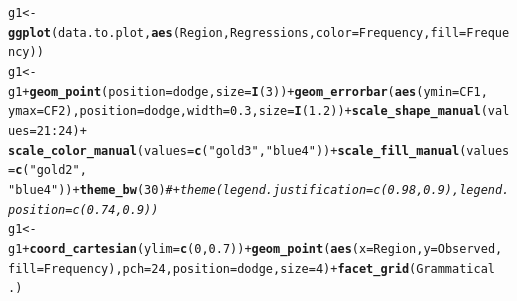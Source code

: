 \documentclass{article}\usepackage[]{graphicx}\usepackage[]{color}
\makeatletter
\newcommand{\hlnum}[1]{\textcolor[rgb]{0.686,0.059,0.569}{#1}}%
\newcommand{\hlstr}[1]{\textcolor[rgb]{0.192,0.494,0.8}{#1}}%
\newcommand{\hlcom}[1]{\textcolor[rgb]{0.678,0.584,0.686}{\textit{#1}}}%
\newcommand{\hlopt}[1]{\textcolor[rgb]{0,0,0}{#1}}%
\newcommand{\hlstd}[1]{\textcolor[rgb]{0.345,0.345,0.345}{#1}}%
\newcommand{\hlkwb}[1]{\textcolor[rgb]{0.69,0.353,0.396}{#1}}%
\newcommand{\hlkwc}[1]{\textcolor[rgb]{0.333,0.667,0.333}{#1}}%
\newcommand{\hlkwd}[1]{\textcolor[rgb]{0.737,0.353,0.396}{\textbf{#1}}}%
\newenvironment{kframe}{%
 \def\at@end@of@kframe{}%
 \ifinner\ifhmode%
  \def\at@end@of@kframe{\end{minipage}}%
  \begin{minipage}{\columnwidth}%
 \fi\fi%
 \def\FrameCommand##1{\hskip\@totalleftmargin \hskip-\fboxsep
 \colorbox{shadecolor}{##1}\hskip-\fboxsep
     \hskip-\linewidth \hskip-\@totalleftmargin \hskip\columnwidth}%
 \MakeFramed {\advance\hsize-\width
   \@totalleftmargin\z@ \linewidth\hsize
   \@setminipage}}%
 {\par\unskip\endMakeFramed%
 \at@end@of@kframe}
\newenvironment{knitrout}{}{} %
\makeatother
\begin{document}
\begin{knitrout}
\color{fgcolor}\begin{kframe}
\begin{alltt}
\hlstd{g1} \hlkwb{<-} \hlkwd{ggplot}\hlstd{(data.to.plot,} \hlkwd{aes}\hlstd{(Region, Regressions,} \hlkwc{color} \hlstd{= Frequency,} \hlkwc{fill} \hlstd{= Frequency))}
\hlstd{g1} \hlkwb{<-} \hlstd{g1} \hlopt{+} \hlkwd{geom_point}\hlstd{(}\hlkwc{position} \hlstd{= dodge,} \hlkwc{size} \hlstd{=} \hlkwd{I}\hlstd{(}\hlnum{3}\hlstd{))} \hlopt{+} \hlkwd{geom_errorbar}\hlstd{(}\hlkwd{aes}\hlstd{(}\hlkwc{ymin} \hlstd{= CF1,}
    \hlkwc{ymax} \hlstd{= CF2),} \hlkwc{position} \hlstd{= dodge,} \hlkwc{width} \hlstd{=} \hlnum{0.3}\hlstd{,} \hlkwc{size} \hlstd{=} \hlkwd{I}\hlstd{(}\hlnum{1.2}\hlstd{))} \hlopt{+} \hlkwd{scale_shape_manual}\hlstd{(}\hlkwc{values} \hlstd{=} \hlnum{21}\hlopt{:}\hlnum{24}\hlstd{)} \hlopt{+}
    \hlkwd{scale_color_manual}\hlstd{(}\hlkwc{values} \hlstd{=} \hlkwd{c}\hlstd{(}\hlstr{"gold3"}\hlstd{,} \hlstr{"blue4"}\hlstd{))} \hlopt{+} \hlkwd{scale_fill_manual}\hlstd{(}\hlkwc{values} \hlstd{=} \hlkwd{c}\hlstd{(}\hlstr{"gold2"}\hlstd{,}
    \hlstr{"blue4"}\hlstd{))} \hlopt{+} \hlkwd{theme_bw}\hlstd{(}\hlnum{30}\hlstd{)}  \hlcom{# + theme(legend.justification = c(0.98, 0.9), legend.position = c(0.74, 0.9)) }
\hlstd{g1} \hlkwb{<-} \hlstd{g1} \hlopt{+} \hlkwd{coord_cartesian}\hlstd{(}\hlkwc{ylim} \hlstd{=} \hlkwd{c}\hlstd{(}\hlnum{0}\hlstd{,} \hlnum{0.7}\hlstd{))} \hlopt{+} \hlkwd{geom_point}\hlstd{(}\hlkwd{aes}\hlstd{(}\hlkwc{x} \hlstd{= Region,} \hlkwc{y} \hlstd{= Observed,}
    \hlkwc{fill} \hlstd{= Frequency),} \hlkwc{pch} \hlstd{=} \hlnum{24}\hlstd{,} \hlkwc{position} \hlstd{= dodge,} \hlkwc{size} \hlstd{=} \hlnum{4}\hlstd{)} \hlopt{+} \hlkwd{facet_grid}\hlstd{(Grammatical} \hlopt{~}
    \hlstd{.)}
\end{alltt}
\end{kframe}
\end{knitrout}
\end{document}
